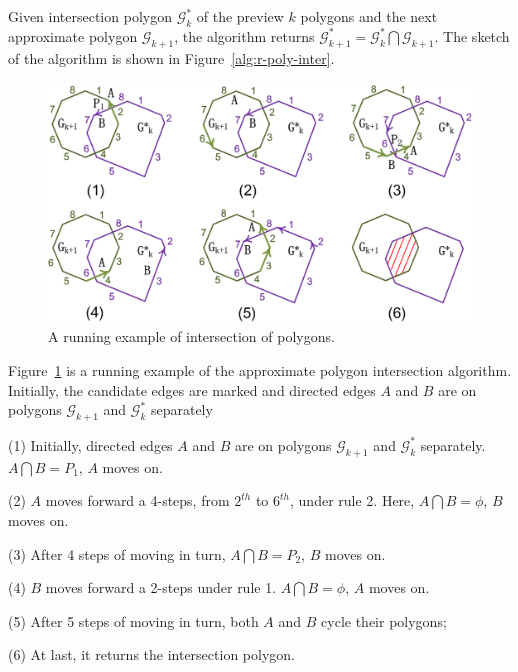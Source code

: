 \stitle{\textcolor[rgb]{0.00,0.07,1.00}{Regular polygon intersection algorithm}}
Given intersection polygon $\mathcal{G}^*_k$ of the preview $k$ polygons and the next approximate polygon $\mathcal{G}_{k+1}$, the algorithm returns $\mathcal{G}^*_{k+1} = \mathcal{G}^*_k  \bigcap \mathcal{G}_{k+1}$.
The sketch of the algorithm is shown in Figure~\ref{alg:r-poly-inter}.







\begin{figure}[tb!]
\centering
\includegraphics[scale=0.88]{figures/Fig-r-poly-inter.png}
\vspace{-1ex}
\caption{\small A running example of intersection of polygons.}
\vspace{-2ex}
\label{fig:r-poly-inter}
\end{figure}




\begin{example}
Figure~\ref{fig:r-poly-inter} is a running example of the approximate polygon intersection algorithm.
Initially, the candidate edges are marked and directed edges $A$ and $B$ are on polygons $\mathcal{G}_{k+1}$ and $\mathcal{G}^*_{k}$ separately

\ni (1) Initially, directed edges $A$ and $B$ are on polygons $\mathcal{G}_{k+1}$ and $\mathcal{G}^*_{k}$ separately. $A \bigcap B = P_1$, $A$ moves on.

\ni (2) $A$ moves forward a 4-steps, from $2^{th}$ to $6^{th}$, under rule 2. Here, $A \bigcap B = \phi$, $B$ moves on.

\ni (3) After 4 steps of moving in turn, $A \bigcap B = P_2$, $B$ moves on.

\ni (4) $B$ moves forward a 2-steps under rule 1. $A \bigcap B = \phi$, $A$ moves on.

\ni (5) After 5 steps of moving in turn, both $A$ and $B$ cycle their polygons;

\ni (6) At last, it returns the intersection polygon.
\end{example}






